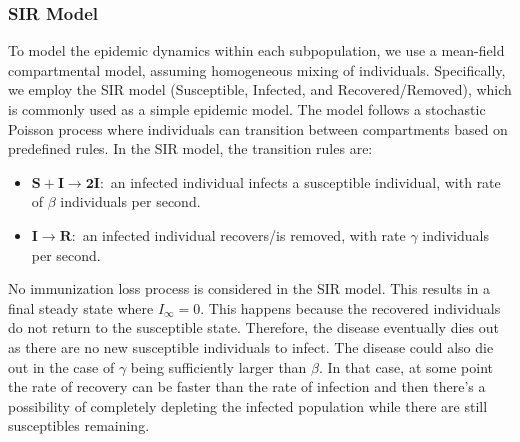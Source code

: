 \subsubsection{SIR Model}
To model the epidemic dynamics within each subpopulation, we use a mean-field compartmental model, assuming homogeneous mixing of individuals. Specifically, we employ the SIR model (Susceptible, Infected, and Recovered/Removed), which is commonly used as a simple epidemic model. The model follows a stochastic Poisson process where individuals can transition between compartments based on predefined rules. In the SIR model, the transition rules are:
\begin{itemize}
    \item $\mathbf{S + I \rightarrow 2I:}$ an infected individual infects a susceptible individual, with rate of $\beta$ individuals per second.
    \item $\mathbf{I \rightarrow R:}$ an infected individual recovers/is removed, with rate $\gamma$ individuals per second.
    
\end{itemize}

No immunization loss process is considered in the SIR model. This results in a final steady state where $I_\infty=0$. This happens because the recovered individuals do not return to the susceptible state. Therefore, the disease eventually dies out as there are no new susceptible individuals to infect. The disease could also die out in the case of $\gamma$ being sufficiently larger than $\beta$. In that case, at some point the rate of recovery can be faster than the rate of infection and then there's a possibility of completely depleting the infected population while there are still susceptibles remaining.

